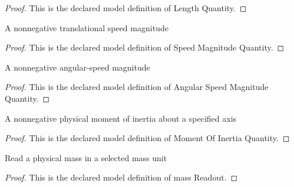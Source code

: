 \begin{proof}
  This is the declared model definition of Length Quantity.
\end{proof}
\begin{definition}
  \label{def:physics:phyx-mini-0335:phyxminiproblems-problemphyxmini0335-speedmagnitudequantity}
  A nonnegative translational speed magnitude
\end{definition}
\begin{proof}
  This is the declared model definition of Speed Magnitude Quantity.
\end{proof}
\begin{definition}
  \label{def:physics:phyx-mini-0335:phyxminiproblems-problemphyxmini0335-angularspeedmagnitudequantity}
  A nonnegative angular-speed magnitude
\end{definition}
\begin{proof}
  This is the declared model definition of Angular Speed Magnitude Quantity.
\end{proof}
\begin{definition}
  \label{def:physics:phyx-mini-0335:phyxminiproblems-problemphyxmini0335-momentofinertiaquantity}
  A nonnegative physical moment of inertia about a specified axis
\end{definition}
\begin{proof}
  This is the declared model definition of Moment Of Inertia Quantity.
\end{proof}
\begin{definition}
  \label{def:physics:phyx-mini-0335:phyxminiproblems-problemphyxmini0335-massreadout}
  Read a physical mass in a selected mass unit
\end{definition}
\begin{proof}
  This is the declared model definition of mass Readout.
\end{proof}
